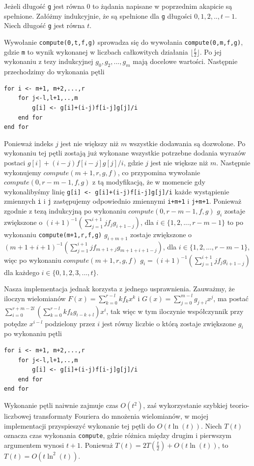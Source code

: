 \documentclass{article}
\begin{document}
Jeżeli długość \texttt{g} jest równa $0$ to żądania napisane w poprzednim akapicie są spełnione. 
Załóżmy indukcyjnie, że są spełnione dla \texttt{g} długości $0,1,2,..,t-1$. Niech długość \texttt{g} jest równa $t$.

Wywołanie \texttt{compute(0,t,f,g)} sprowadza się do wywołania \texttt{compute(0,m,f,g)}, gdzie \texttt{m} to wynik wykonanej w
liczbach całkowitych działania $\lfloor \frac{t}{2}\rfloor$. Po jej wykonaniu z tezy indukcyjnej $g_0,g_2,...,g_m$ mają docelowe
wartości. Następnie przechodzimy do wykonania pętli
\begin{verbatim}
for i <- m+1, m+2,...,r
    for j<-l,l+1,..,m
        g[i] <- g[i]+(i-j)f[i-j]g[j]/i
    end for
end for
\end{verbatim}

Ponieważ indeks $j$ jest nie większy niż $m$ wszystkie dodawania są dozwolone. 
Po wykonaniu tej pętli zostają już wykonane wszystkie
potrzebne dodania wyrazów postaci $g[i]+(i-j)f[i-j]g[j]/i$, gdzie $j$ jest nie większe niż $m$. 
Następnie wykonujemy $compute(m+1,r,g,f)$, co przypomina wywołanie $compute(0,r-m-1,f,g)$ z tą modyfikacją, że w momencie 
gdy wykonalibyśmy linię \texttt{g[i] <- g[i]+(i-j)f[i-j]g[j]/i} każde wystąpienie
zmiennych \texttt{i} i \texttt{j} zastępujemy odpowiednio zmiennymi \texttt{i+m+1} i \texttt{j+m+1}. Ponieważ zgodnie z tezą
indukcyjną po wykonaniu \texttt{$compute(0,r-m-1,f,g)$}
$g_i$ zostaje zwiększone o $(i+1)^{-1}(\sum_{j=1}^{i+1}jf_jg_{i+1-j})$, dla $i \in \{1,2,...,r-m-1\}$ 
to po wykonaniu \texttt{compute(m+1,r,f,g)} $g_{i+m+1}$  zostaje zwiększone o $(m+1+i+1)^{-1}(\sum_{j=1}^{i+1}jf_{m+1+j}g_{m+1+i+1-j})$, 
dla $i \in \{1,2,...,r-m-1\}$, więc po wykonaniu $compute(m+1,r,g,f)$ $g_i=(i+1)^{-1}(\sum_{j=1}^{i+1}jf_jg_{i+1-j})$ dla każdego
$i \in \{0,1,2,3,...,t\}$. 

Nasza implementacja jednak korzysta z jednego usprawnienia. Zauważmy, że iloczyn wielomianów $F(x)=\sum_{k=0}^{r-l}kf_kx^k$ i 
$G(x)=\sum_{j=0}^{m-l}g_{j+l}x^j$, ma postać 
$\sum_{i=0}^{r+m-2l}(\sum_{k=0}^{r-l}kf_kg_{i-k+l})x^i$, tak więc w tym iloczynie współczynnik przy potędze $x^{i-l}$ podzielony
przez $i$ jest równy liczbie o którą zostaje zwiększone $g_i$ po wykonaniu pętli
\begin{verbatim}
for i <- m+1, m+2,...,r
    for j<-l,l+1,..,m
        g[i] <- g[i]+(i-j)f[i-j]g[j]/i
    end for
end for
\end{verbatim}

Wykonanie pętli naiwnie zajmuje czas $O(t^2)$, zaś wykorzystanie szybkiej teorio-liczbowej transformaty Fouriera do mnożenia wielomianów,
w mojej implementacji przyspieszyć wykonanie tej pętli do $O(t\ln(t))$.
Niech $T(t)$ oznacza czas wykonania \texttt{compute}, gdzie różnica między drugim i pierwszym argumentem wynosi $t+1$.
Ponieważ $T(t)=2T(\frac{t}{2})+O(t\ln(t))$, to $T(t)=O(t \ln^2(t))$.
\end{document}
